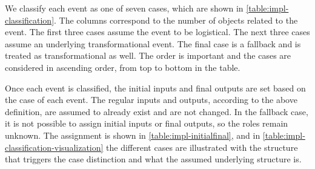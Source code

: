 We classify each event as one of seven cases, which are shown in \autoref{table:impl-classification}.
The columns correspond to the number of objects related to the event.
The first three cases assume the event to be logistical.
The next three cases assume an underlying transformational event.
The final case is a fallback and is treated as transformational as well.
The order is important and the cases are considered in ascending order, from top to bottom in the table.



\begin{table}[h]
    \centering
    \caption{The different cases in our classification.}
    \label{table:impl-classification}
\end{table}


Once each event is classified, the initial inputs and final outputs are set based on the case of each event.
The regular inputs and outputs, according to the above definition, are assumed to already exist and are not changed.
In the fallback case, it is not possible to assign initial inputs or final outputs, so the roles remain unknown.
The assignment is shown in \autoref{table:impl-initialfinal}, and in \autoref{table:impl-classification-visualization} the different cases are illustrated with the structure that triggers the case distinction and what the assumed underlying structure is.


